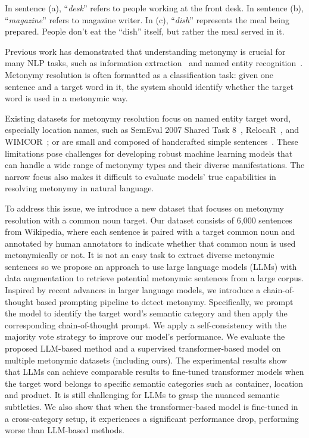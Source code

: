 \documentclass[11pt]{article}
\begin{document}
In sentence (a), ``\textit{desk}'' refers to people working at the front desk. In sentence (b), ``\textit{magazine}'' refers to magazine writer. In (c), ``\textit{dish}'' represents the meal being prepared. People don't eat the ``dish'' itself, but rather the meal served in it. 

Previous work has demonstrated that understanding metonymy is crucial for many NLP tasks, such as information extraction~\citep{leveling2008metonymy} and named entity recognition~\citep{gritta2018s}. Metonymy resolution is often formatted as a classification task: given one sentence and a target word in it, the system should identify whether the target word is used in a metonymic way.

Existing datasets for metonymy resolution focus on named entity target word, especially location names, such as SemEval 2007 Shared Task 8~\citep{markert-nissim-2007-semeval}, RelocaR~\citep{gritta-etal-2017-vancouver}, and WIMCOR~\citep{alex-mathews-strube-2020-large}; or are small and composed of handcrafted simple sentences~\citep{pedinotti-lenci-2020-dont}. These limitations pose challenges for developing robust machine learning models that can handle a wide range of metonymy types and their diverse manifestations. The narrow focus also makes it difficult to evaluate models' true capabilities in resolving metonymy in natural language.

To address this issue, we introduce a new dataset that focuses on metonymy resolution with a common noun target. Our dataset consists of 6,000 sentences from Wikipedia, where each sentence is paired with a target common noun and annotated by human annotators to indicate whether that common noun is used metonymically or not. It is not an easy task to extract diverse metonymic sentences so we propose an approach to use large language models (LLMs) with data augmentation to retrieve potential metonymic sentences from a large corpus. Inspired by recent advances in larger language models, we introduce a chain-of-thought based prompting pipeline to detect metonymy. Specifically, we prompt the model to identify the target word's semantic category and then apply the corresponding chain-of-thought prompt. We apply a self-consistency with the majority vote strategy to improve our model's performance. We evaluate the proposed LLM-based method and a supervised transformer-based model on multiple metonymic datasets (including ours). The experimental results show that LLMs can achieve comparable results to fine-tuned transformer models when the target word belongs to specific semantic categories such as container, location and product. It is still challenging for LLMs to grasp the nuanced semantic subtleties. We also show that when the transformer-based model is fine-tuned in a cross-category setup, it experiences a significant performance drop, performing worse than LLM-based methods.
\end{document}
